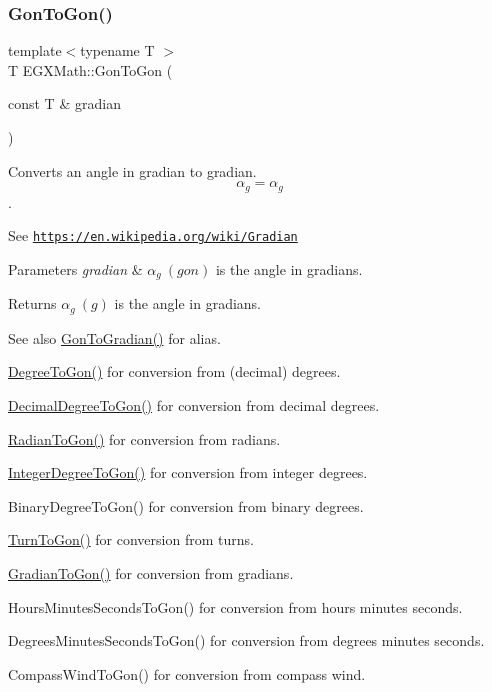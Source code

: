 \subsubsection{\texorpdfstring{Gon\+To\+Gon()}{GonToGon()}}
{\footnotesize\ttfamily template$<$typename T $>$ \\
T E\+G\+X\+Math\+::\+Gon\+To\+Gon (\begin{DoxyParamCaption}\item[{const T \&}]{gradian }\end{DoxyParamCaption})}



Converts an angle in gradian to gradian. \[\alpha_{g}=\alpha_{g}\]. 

See \href{https://en.wikipedia.org/wiki/Gradian}{\tt https\+://en.\+wikipedia.\+org/wiki/\+Gradian} 
\begin{DoxyParams}{Parameters}
{\em gradian} & $\alpha_{g}\ (gon)$ is the angle in gradians. \\
\hline
\end{DoxyParams}
\begin{DoxyReturn}{Returns}
$\alpha_{g}\ (g)$ is the angle in gradians. 
\end{DoxyReturn}
\begin{DoxySeeAlso}{See also}
\mbox{\hyperlink{group___e_g_x_math-_angle_conversions-_gon_ga69eb507d44c7a0bfc5660ed3ebcc2f1a}{Gon\+To\+Gradian()}} for alias. 

\mbox{\hyperlink{group___e_g_x_math-_angle_conversions-_degree_ga87c3fab0867021e5d2501197b4db6194}{Degree\+To\+Gon()}} for conversion from (decimal) degrees. 

\mbox{\hyperlink{group___e_g_x_math-_angle_conversions-_decimal_degree_gaeb333a1ad0aeb913c025fbd1be85fcb3}{Decimal\+Degree\+To\+Gon()}} for conversion from decimal degrees. 

\mbox{\hyperlink{group___e_g_x_math-_angle_conversions-_radian_ga36912e5a810b64c271c4dafc17f4ca45}{Radian\+To\+Gon()}} for conversion from radians. 

\mbox{\hyperlink{group___e_g_x_math-_angle_conversions-_integer_degree_ga6e5be425c37ad27319f09329156c64bb}{Integer\+Degree\+To\+Gon()}} for conversion from integer degrees. 

Binary\+Degree\+To\+Gon() for conversion from binary degrees. 

\mbox{\hyperlink{group___e_g_x_math-_angle_conversions-_turn_gad81dd0bb1660ef24e28fa15b2403dec7}{Turn\+To\+Gon()}} for conversion from turns. 

\mbox{\hyperlink{group___e_g_x_math-_angle_conversions-_gradian_gaff399262b6c8455e450e0a9dc8eb2ad1}{Gradian\+To\+Gon()}} for conversion from gradians. 

Hours\+Minutes\+Seconds\+To\+Gon() for conversion from hours minutes seconds. 

Degrees\+Minutes\+Seconds\+To\+Gon() for conversion from degrees minutes seconds. 

Compass\+Wind\+To\+Gon() for conversion from compass wind. 
\end{DoxySeeAlso}
